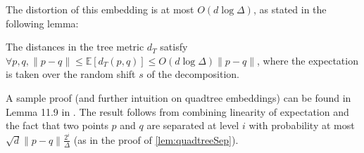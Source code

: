 The distortion of this embedding is at most $O(d \log \Delta)$, as stated in the following lemma:
\begin{lemma}\label{lem:quadtreeDist}
The distances in the tree metric $d_T$ satisfy
$\forall p,q, \|p-q\| \leq \mathbb{E}[d_T(p, q)] \leq O(d \log \Delta) \|p-q\|$, where the expectation is taken over the random shift $s$ of the decomposition.
\end{lemma}

A sample proof (and further intuition on quadtree embeddings) can be found in Lemma 11.9 in \cite{har2011geometric}. The result follows from combining linearity
of expectation and the fact that two points $p$ and $q$ are separated at level $i$ with probability at most $\sqrt{d} \|p-q\| \frac{2^i}{\Delta}$ (as in the
proof of \cref{lem:quadtreeSep}).
